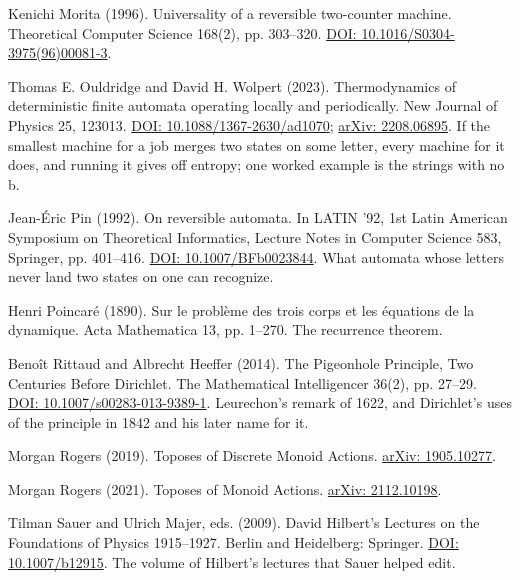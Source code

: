 \documentclass[11pt,twoside]{article}
\theoremstyle{thielethm}
\theoremstyle{thieledef}
\theoremstyle{thieledef}
\theoremstyle{thieledef}
\theoremstyle{thielethm}
\theoremstyle{thieleobs}
\theoremstyle{thielethm}
\begin{document}
\noindent Kenichi Morita (1996). Universality of a reversible two-counter machine. Theoretical Computer Science 168(2), pp. 303--320. \href{https://doi.org/10.1016/S0304-3975(96)00081-3}{DOI: 10.1016/S0304-3975(96)00081-3}.
\par\medskip

\noindent Thomas E. Ouldridge and David H. Wolpert (2023). Thermodynamics of deterministic finite automata operating locally and periodically. New Journal of Physics 25, 123013. \href{https://doi.org/10.1088/1367-2630/ad1070}{DOI: 10.1088/1367-2630/ad1070}; \href{https://arxiv.org/abs/2208.06895}{arXiv: 2208.06895}. If the smallest machine for a job merges two states on some letter, every machine for it does, and running it gives off entropy; one worked example is the strings with no b.
\par\medskip

\noindent Jean-\'Eric Pin (1992). On reversible automata. In LATIN '92, 1st Latin American Symposium on Theoretical Informatics, Lecture Notes in Computer Science 583, Springer, pp. 401--416. \href{https://doi.org/10.1007/BFb0023844}{DOI: 10.1007/BFb0023844}. What automata whose letters never land two states on one can recognize.
\par\medskip

\noindent Henri Poincar\'e (1890). Sur le probl\`eme des trois corps et les \'equations de la dynamique. Acta Mathematica 13, pp. 1--270. The recurrence theorem.
\par\medskip

\noindent Beno\^it Rittaud and Albrecht Heeffer (2014). The Pigeonhole Principle, Two Centuries Before Dirichlet. The Mathematical Intelligencer 36(2), pp. 27--29. \href{https://doi.org/10.1007/s00283-013-9389-1}{DOI: 10.1007/s00283-013-9389-1}. Leurechon's remark of 1622, and Dirichlet's uses of the principle in 1842 and his later name for it.
\par\medskip

\noindent Morgan Rogers (2019). Toposes of Discrete Monoid Actions. \href{https://arxiv.org/abs/1905.10277}{arXiv: 1905.10277}.
\par\medskip

\noindent Morgan Rogers (2021). Toposes of Monoid Actions. \href{https://arxiv.org/abs/2112.10198}{arXiv: 2112.10198}.
\par\medskip

\noindent Tilman Sauer and Ulrich Majer, eds. (2009). David Hilbert's Lectures on the Foundations of Physics 1915--1927. Berlin and Heidelberg: Springer. \href{https://doi.org/10.1007/b12915}{DOI: 10.1007/b12915}. The volume of Hilbert's lectures that Sauer helped edit.
\par\medskip
\end{document}
